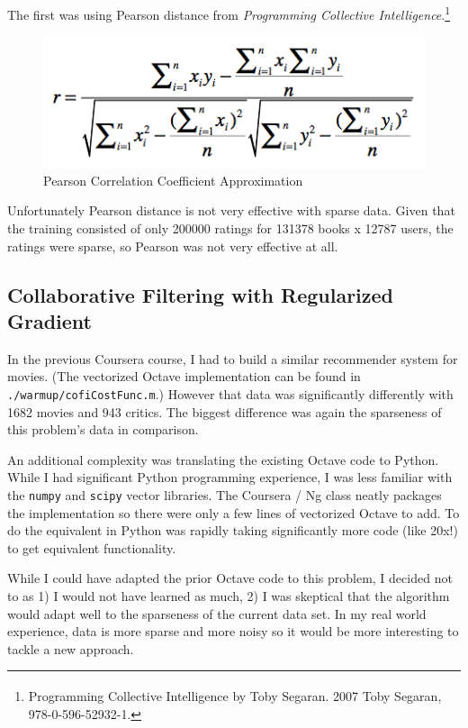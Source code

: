 \documentclass[11pt, oneside]{article}   	%
\begin{document}
The first was using Pearson distance from \emph{Programming Collective Intelligence}.\footnote{Programming Collective Intelligence by Toby Segaran. \textsuperscript{\textcopyright} 2007 Toby Segaran, 978-0-596-52932-1.}

\begin{figure}[h!]
\centering
\includegraphics[scale=0.6]{pearson}
\caption{Pearson Correlation Coefficient Approximation}
\end{figure}

Unfortunately Pearson distance is not very effective with sparse data. Given that the training consisted of only 200000 ratings for 131378 books x 12787 users, the ratings were sparse, so Pearson was not very effective at all.

\subsection*{Collaborative Filtering with Regularized Gradient}

\par In the previous Coursera course, I had to build a similar recommender system for movies. (The vectorized Octave implementation can be found in \texttt{./warmup/cofiCostFunc.m}.) However that data was significantly differently with 1682 movies and 943 critics. The biggest difference was again the sparseness of this problem's data in comparison.

An additional complexity was translating the existing Octave code to Python. While I had significant Python programming experience, I was less familiar with the \texttt{numpy} and \texttt{scipy} vector libraries. The Coursera / Ng class neatly packages the implementation so there were only a few lines of vectorized Octave to add. To do the equivalent in Python was rapidly taking significantly more code (like 20x!) to get equivalent functionality. 

While I could have adapted the prior Octave code to this problem, I decided not to as 1) I would not have learned as much, 2) I was skeptical that the algorithm would adapt well to the sparseness of the current data set. In my real world experience, data is more sparse and more noisy so it would be more interesting to tackle a new approach.
\end{document}
